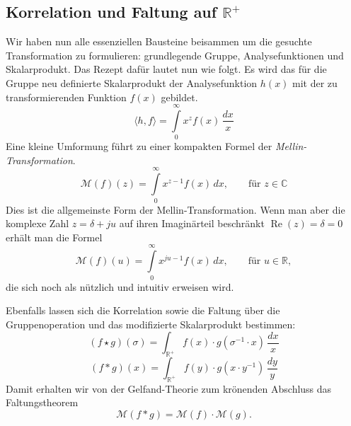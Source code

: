 \subsection{Korrelation und Faltung auf $\mathbb{R^+}$
\label{mellin:subsection:faltung}}
Wir haben nun alle essenziellen Bausteine beisammen um die gesuchte 
Transformation zu formulieren: grundlegende Gruppe, Analysefunktionen 
und Skalarprodukt.
Das Rezept dafür lautet nun wie folgt. Es wird das für die Gruppe neu 
definierte Skalarprodukt der Analysefunktion $h(x)$ mit der zu 
transformierenden Funktion $f(x)$ gebildet.
\begin{equation}
    \langle h,f \rangle 
    = \int\limits_{0}^{\infty} x^{z} f(x) \,\frac{{d}x}{x}
\end{equation}
Eine kleine Umformung führt zu einer kompakten Formel der 
{\em Mellin-Transformation}.
\begin{equation}
    \mathcal{M}(f)(z) 
    = \int\limits_{0}^{\infty} x^{z-1} f(x) \,{d}x,
    \qquad\text{für $z \in \mathbb{C}$}
    \label{mellin:mellin}
\end{equation}
Dies ist die allgemeinste Form der Mellin-Transformation. 
Wenn man aber die komplexe Zahl $z = \delta + ju$ auf ihren Imaginärteil 
beschränkt $\operatorname{Re}(z) = \delta = 0$ erhält man die Formel
\begin{equation}
    \mathcal{M}(f)(u) 
    = \int\limits_{0}^{\infty} x^{ju-1} f(x) \,{d}x,
    \qquad\text{für $u \in \mathbb{R}$}
    ,
    \label{mellin:mellinu}
\end{equation}
die sich noch als nützlich und intuitiv erweisen wird.

Ebenfalls lassen sich die Korrelation sowie die Faltung über die 
Gruppenoperation und das modifizierte Skalarprodukt bestimmen:
\begin{equation}
    (f \star g)(\sigma ) 
    = \int_\mathbb{R^+} 
    f(x) \cdot g(\sigma ^{-1} \cdot x)\,\frac{{d}x}{x}
    \label{mellin:kreuzkorrelation*}
\end{equation}
\begin{equation}
    (f \ast g)(x) 
    = \int_\mathbb{R^+} 
    f(y) \cdot g(x \cdot y^{-1})\,\frac{{d}y}{y} 
\end{equation}
Damit erhalten wir von der Gelfand-Theorie zum krönenden Abschluss das 
Faltungstheorem
\begin{equation}
    \mathcal{M}\left(f \ast g\right)
    = \mathcal{M}\left(f\right) \cdot \mathcal{M}\left(g\right)
    .
\end{equation}

